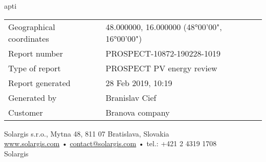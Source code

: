apti     \documentclass[10pt,a4paper,UTF8]{article}
\renewcommand{\arraystretch}{1.3}  %
\begin{document}
\begin{titlepage}
	\vspace{1cm}
	\bgroup
	\def\arraystretch{1.5}%
	\setlength{\tabcolsep}{0}
    \begin{tabular} { p{5cm}p{15cm} }
    Geographical coordinates & 48.000000, 16.000000 (48°00'00", 16°00'00") \\
    Report number & PROSPECT-10872-190228-1019 \\
    Type of report & PROSPECT PV energy review \\
    Report generated & 28 Feb 2019, 10:19 \\
    Generated by & Branislav Cief \\
    Customer & Branova company
    \end{tabular}
	\egroup

	\vfill
	\vspace{2cm}

	{\scriptsize Solargis s.r.o., Mytna 48, 811 07 Bratislava, Slovakia \\}
	{\scriptsize \url{www.solargis.com} • \href{mailto:contact@solargis.com}{contact@solargis.com} • tel.: +421 2 4319 1708 \\}
	{\scriptsize {\textcopyright} {\the\year} Solargis \\}

\end{titlepage}
\end{document}
